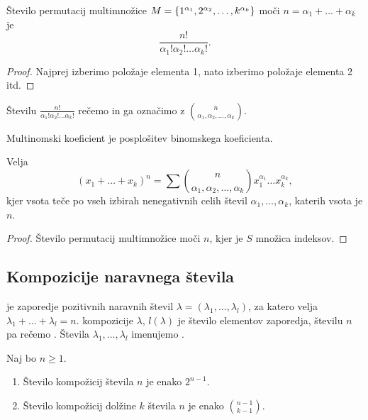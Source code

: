\begin{trditev}
    Število permutacij multimnožice $M=\left\{1^{\alpha_1}, 2^{\alpha_2}, \ldots, k^{\alpha_k}\right\}$ moči $n = \alpha_1 + \ldots + \alpha_k$ je 
    $$\frac{n!}{\alpha_1!\alpha_2!\ldots\alpha_k!}.$$
\end{trditev}

\begin{proof}
    Najprej izberimo položaje elementa 1, nato izberimo položaje elementa 2 itd.
\end{proof}

\begin{definicija}
    Številu $\frac{n!}{\alpha_1! \alpha_2! \ldots \alpha_k!}$ rečemo  in ga označimo z $\binom{n}{\alpha_1, \alpha_2, \ldots, \alpha_k}$.
\end{definicija}

\begin{opomba}
    Multinomski koeficient je posplošitev binomskega koeficienta.
\end{opomba}

\begin{trditev}
    Velja 
    $$(x_1 + \ldots + x_k)^n = \sum \binom{n}{\alpha_1, \alpha_2, \ldots, \alpha_k}x_1^{\alpha_1} \ldots x_k^{\alpha_k},$$
    kjer vsota teče po vseh izbirah nenegativnih celih števil $\alpha_1, \ldots, \alpha_k$, katerih vsota je $n$.
\end{trditev}

\begin{proof}
    Število permutacij multimnožice moči $n$, kjer je $S$ množica indeksov.
\end{proof}

\subsection{Kompozicije naravnega števila}
\begin{definicija}
     je zaporedje pozitivnih naravnih števil $\lambda = (\lambda_1, \ldots, \lambda_l)$, za katero velja $\lambda_1 + \ldots + \lambda_l = n$.  kompozicije $\lambda$, $l(\lambda)$ je število elementov zaporedja, številu $n$ pa rečemo . Števila $\lambda_1, \ldots, \lambda_l$ imenujemo .
\end{definicija}

\begin{trditev}
    Naj bo $n \geq 1$.
    \begin{enumerate}
        \item Število kompožicij števila $n$ je enako $2^{n-1}$.
        \item Število kompožicij dolžine $k$ števila $n$ je enako $\binom{n-1}{k-1}$.
    \end{enumerate}
\end{trditev}

